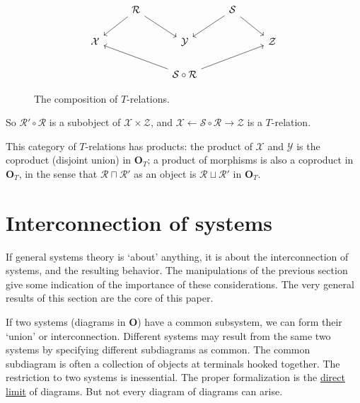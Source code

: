 \documentclass[10pt,a4paper,twocolumn]{article}
\newcommand{\Scal}{\mathcal{S}}
\newcommand{\X}{\mathcal{X}}
\newcommand{\Y}{\mathcal{Y}}
\newcommand{\Z}{\mathcal{Z}}
\newcommand{\Ocat}{\mathbf{O}}          %
\newcommand{\Tcat}{\Ocat_{T}}      %
\newcommand{\Rcal}{\mathcal{R}}          %
\begin{document}
\begin{figure}
  \begin{equation*}
    \begin{tikzcd}
      & \Rcal && \Scal & \\
      \X && \Y && \Z \\
      && {\Scal \circ \Rcal}
      \arrow[from=1-2, to=2-1]
      \arrow[from=1-2, to=2-3]
      \arrow[from=1-4, to=2-3]
      \arrow[from=1-4, to=2-5]
      \arrow[from=3-3, to=2-1]
      \arrow[from=3-3, to=2-5]
    \end{tikzcd}
  \end{equation*}
  \caption{\footnotesize The composition of $T$-relations.}%
  \label{fig:t-rel-comp}%
\end{figure}

So $\Rcal'\circ\Rcal$ is a subobject of $\X\times \Z$, and
$\X \leftarrow \Scal \circ \Rcal \to \Z$ is a $T$-relation.

This category of $T$-relations has products: the product of $\X$ and $\Y$ is the coproduct (disjoint union) in $\Tcat$; a product of morphisms is also a coproduct in $\Tcat$, in the sense that $\Rcal \sqcap \Rcal'$ as an object is $\Rcal \sqcup \Rcal'$ in $\Tcat$.

\section{Interconnection of systems}

If general systems theory is `about' anything, it is about the interconnection of systems, and the resulting behavior.
The manipulations of the previous section give some indication of the importance of these considerations.
The very general results of this section are the core of this paper.

If two systems (diagrams in $\Ocat$) have a common subsystem, we can form their `union' or interconnection.
Different systems may result from the same two systems by specifying different subdiagrams as common.
The common subdiagram is often a collection of objects at terminals hooked together.
The restriction to two systems is inessential.
The proper formalization is the \underline{direct limit} of diagrams.
But not every diagram of diagrams can arise.
\end{document}
